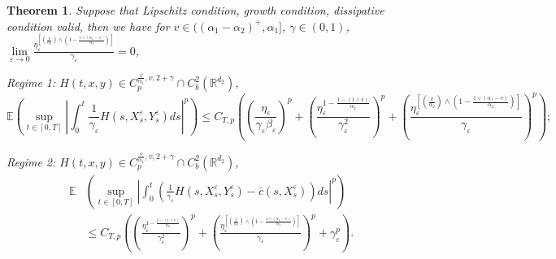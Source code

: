 \documentclass[11pt,reqno]{amsart}
\newtheorem{theorem}{\indent Theorem}[section]
\numberwithin{equation}{section}
\begin{document}
\begin{theorem}\label{T53}
	Suppose that  Lipschitz condition, growth condition, dissipative condition valid,  then we have for  $v\in((\alpha_{1}-\alpha_{2})^{+},\alpha_{1}]$, $\gamma\in(0,1)$, $ \lim\limits_{\varepsilon \rightarrow0}\frac{\eta_{\varepsilon}^{\left[ \left( \frac{v}{\alpha_{2}}\right) \wedge \left( 1-\frac{1\vee(\alpha_{1}-v)}{\alpha_{2}}\right) \right] }}{\gamma_{\varepsilon} } =0$,
	

Regime 1:   $H(t,x,y)\in C_{p}^{\frac{v}{\alpha_{1}},v, 2+\gamma}\cap C_{b}^{2}(\mathbb{R}^{d_{2}})$,    
\begin{equation}\label{5.59}
	\mathbb{E}\left( \sup_{t\in [0,T]}\left| \int_{0}^{t} \frac{1}{\gamma_{\varepsilon}}H(s,X_{s}^{\varepsilon},Y_{s}^{\varepsilon})ds\right|^{p} \right)  \leq    C_{T,p}\left(\left(  \frac{\eta_{\varepsilon}}{\gamma_{\varepsilon}\beta_{\varepsilon}}\right) ^{p}+\left(  \frac{\eta_{\varepsilon}^{1-\frac{1-(1\wedge v)}{\alpha_{2}}}}{\gamma_{\varepsilon}^{2}}\right) ^{p}+\left( \frac{\eta_{\varepsilon}^{\left[ \left( \frac{v}{\alpha_{2}}\right) \wedge \left( 1-\frac{1\vee(\alpha_{1}-v)}{\alpha_{2}}\right) \right] }}{\gamma_{\varepsilon} } \right) ^{p}\right);
\end{equation}

Regime 2:  $H(t,x,y)\in C_{p}^{\frac{v}{\alpha_{1}},v, 2+\gamma}\cap C_{b}^{2}(\mathbb{R}^{d_{2}})$,  
\begin{equation}\label{5.60}
		\begin{split}
	\mathbb{E}&\left( \sup_{t\in [0,T]}\left| \int_{0}^{t}\left(  \frac{1}{\gamma_{\varepsilon}}H(s,X_{s}^{\varepsilon},Y_{s}^{\varepsilon})- \bar{c}(s,X_{s}^{\varepsilon})\right) ds\right|^{p} \right) \\
	& \leq  C_{T,p}\left(                                                                                                                                                                                                                                                                           \left(  \frac{\eta_{\varepsilon}^{1-\frac{1-(1\wedge v)}{\alpha_{2}}}}{\gamma_{\varepsilon}^{2}}\right) ^{p}+ \left(  \frac{\eta_{\varepsilon}^{\left[ \left( \frac{v}{\alpha_{2}}\right) \wedge \left( 1-\frac{1\vee(\alpha_{1}-v)}{\alpha_{2}}\right) \right] }}{\gamma_{\varepsilon} } \right) ^{p}+\gamma_{\varepsilon}^{p}\right) .
		\end{split}
\end{equation}
\end{theorem}
\end{document}
